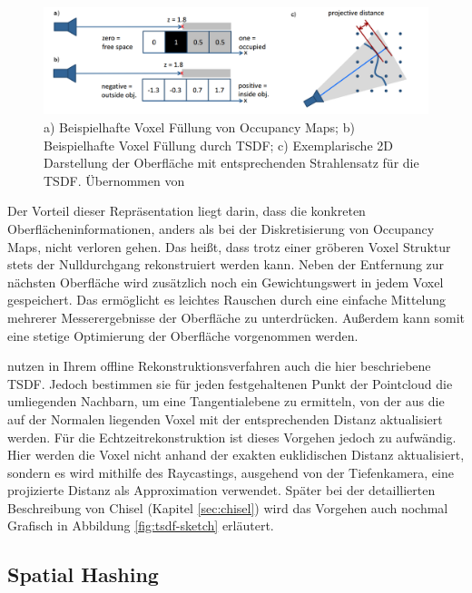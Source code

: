 \begin{figure}
  \centering
	\includegraphics[width=1.0\textwidth]{content/images/methods/tsdf.png} 
  \caption{a) Beispielhafte Voxel Füllung von Occupancy Maps; b) Beispielhafte Voxel Füllung durch TSDF; c) Exemplarische 2D Darstellung der Oberfläche mit entsprechenden Strahlensatz für die TSDF. Übernommen von \citet{Compu66:online}}
  \label{fig:tsdf}
\end{figure}

Der Vorteil dieser Repräsentation liegt darin, dass die konkreten Oberflächeninformationen, anders als bei der Diskretisierung von Occupancy Maps, nicht verloren gehen. Das heißt, dass trotz einer gröberen Voxel Struktur stets der Nulldurchgang rekonstruiert werden kann. Neben der Entfernung zur nächsten Oberfläche wird zusätzlich noch ein Gewichtungswert in jedem Voxel gespeichert. Das ermöglicht es leichtes Rauschen durch eine einfache Mittelung mehrerer Messerergebnisse der Oberfläche zu unterdrücken. Außerdem kann somit eine stetige Optimierung der Oberfläche vorgenommen werden. \citep{Compu66:online}

\citet{hoppe1992surface} nutzen in Ihrem offline Rekonstruktionsverfahren auch die hier beschriebene TSDF. Jedoch bestimmen sie für jeden festgehaltenen Punkt der Pointcloud die umliegenden Nachbarn, um eine Tangentialebene zu ermitteln, von der aus die auf der Normalen liegenden Voxel mit der entsprechenden Distanz aktualisiert werden. Für die Echtzeitrekonstruktion ist dieses Vorgehen jedoch zu aufwändig. Hier werden die Voxel nicht anhand der exakten euklidischen Distanz aktualisiert, sondern es wird mithilfe des Raycastings, ausgehend von der Tiefenkamera, eine projizierte Distanz als Approximation verwendet. \citep{Compu66:online} Später bei der detaillierten Beschreibung von Chisel (Kapitel \ref{sec:chisel}) wird das Vorgehen auch nochmal Grafisch in Abbildung \ref{fig:tsdf-sketch} erläutert.

\subsection{Spatial Hashing}

